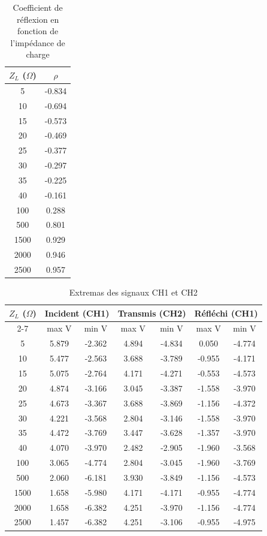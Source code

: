 \begin{table}[h!]
\centering
\caption{Coefficient de réflexion en fonction de l’impédance de charge}
\label{tab:coeff_reflexion}
\begin{tabular}{|c|c|}
\hline
$Z_L$ ($\Omega$) & $\rho$ \\
\hline
5    & -0.834 \\
10   & -0.694 \\
15   & -0.573 \\
20   & -0.469 \\
25   & -0.377 \\
30   & -0.297 \\
35   & -0.225 \\
40   & -0.161 \\
100  &  0.288 \\
500  &  0.801 \\
1500 &  0.929 \\
2000 &  0.946 \\
2500 &  0.957 \\
\hline
\end{tabular}
\end{table}
\begin{table}[h!]
\centering
\caption{Extremas des signaux CH1 et CH2}
\label{tab:extrema_signaux}
\begin{tabular}{|c|c|c|c|c|c|c|}
\hline
\( Z_L \) (\(\Omega\)) & \multicolumn{2}{c|}{Incident (CH1)} & \multicolumn{2}{c|}{Transmis (CH2)} & \multicolumn{2}{c|}{Réfléchi (CH1)} \\
\cline{2-7}
& max V & min V & max V & min V & max V & min V \\
\hline
5    & 5.879  & -2.362 & 4.894  & -4.834 & 0.050  & -4.774 \\
10   & 5.477  & -2.563 & 3.688  & -3.789 & -0.955 & -4.171 \\
15   & 5.075  & -2.764 & 4.171  & -4.271 & -0.553 & -4.573 \\
20   & 4.874  & -3.166 & 3.045  & -3.387 & -1.558 & -3.970 \\
25   & 4.673  & -3.367 & 3.688  & -3.869 & -1.156 & -4.372 \\
30   & 4.221  & -3.568 & 2.804  & -3.146 & -1.558 & -3.970 \\
35   & 4.472  & -3.769 & 3.447  & -3.628 & -1.357 & -3.970 \\
40   & 4.070  & -3.970 & 2.482  & -2.905 & -1.960 & -3.568 \\
100  & 3.065  & -4.774 & 2.804  & -3.045 & -1.960 & -3.769 \\
500  & 2.060  & -6.181 & 3.930  & -3.849 & -1.156 & -4.573 \\
1500 & 1.658  & -5.980 & 4.171  & -4.171 & -0.955 & -4.774 \\
2000 & 1.658  & -6.382 & 4.251  & -3.970 & -1.156 & -4.774 \\
2500 & 1.457  & -6.382 & 4.251  & -3.106 & -0.955 & -4.975 \\
\hline
\end{tabular}
\end{table}

